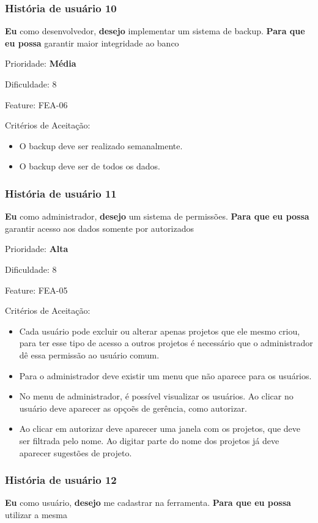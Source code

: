   \subsubsection{História de usuário 10}
    \textbf{Eu} como desenvolvedor, \textbf{desejo} implementar um sistema de backup. \textbf{Para que eu possa} garantir maior integridade ao banco

    Prioridade: \textbf{Média}

    Dificuldade: 8

    Feature: FEA-06

    Critérios de Aceitação:
    \begin{itemize}
      \item O backup deve ser realizado semanalmente.
      \item O backup deve ser de todos os dados.
    \end{itemize}

  \subsubsection{História de usuário 11}
    \textbf{Eu} como administrador, \textbf{desejo} um sistema de permissões. \textbf{Para que eu possa} garantir acesso aos dados somente por autorizados

    Prioridade: \textbf{Alta}

    Dificuldade: 8

    Feature: FEA-05

    Critérios de Aceitação:
    \begin{itemize}
      \item Cada usuário pode excluir ou alterar apenas projetos que ele mesmo criou, para ter esse tipo de acesso a outros projetos é necessário que o administrador dê essa permissão ao usuário comum.
      \item Para o administrador deve existir um menu que não aparece para os usuários.
      \item No menu de administrador, é possível visualizar os usuários. Ao clicar no usuário deve aparecer as opçoẽs de gerência, como autorizar.
      \item Ao clicar em autorizar deve aparecer uma janela com os projetos, que deve ser filtrada pelo nome. Ao digitar parte do nome dos projetos já deve aparecer sugestões de projeto.
    \end{itemize}

  \subsubsection{História de usuário 12}
    \textbf{Eu} como usuário, \textbf{desejo} me cadastrar na ferramenta. \textbf{Para que eu possa} utilizar a mesma

